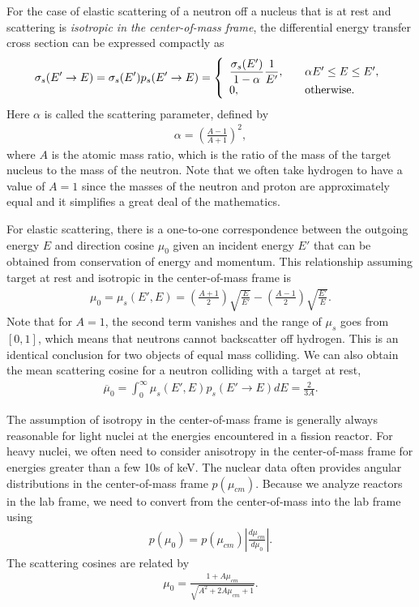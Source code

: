 For the case of elastic scattering of a neutron off a nucleus that is at rest and scattering is \emph{isotropic in the center-of-mass frame}, the differential energy transfer cross section can be expressed compactly as
\begin{align}
  \sigma_s(E' \rightarrow E) = \sigma_s(E') p_s(E' \rightarrow E) = \left\{ \begin{array}{l l}
  \dfrac{\sigma_s(E')}{1 - \alpha} \dfrac{1}{E'}, & \quad \alpha E' \le E \le E', \\
  0, & \quad \text{otherwise}. \\ \end{array} \right.
\end{align}
Here $\alpha$ is called the scattering parameter, defined by
\begin{align}
  \alpha = \left( \frac{A - 1}{A + 1} \right)^2, 
\end{align}
where $A$ is the atomic mass ratio, which is the ratio of the mass of the target nucleus to the mass of the neutron. Note that we often take hydrogen to have a value of $A = 1$ since the masses of the neutron and proton are approximately equal and it simplifies a great deal of the mathematics. 

For elastic scattering, there is a one-to-one correspondence between the outgoing energy $E$ and direction cosine $\mu_0$ given an incident energy $E'$ that can be obtained from conservation of energy and momentum. This relationship assuming target at rest and isotropic in the center-of-mass frame is
\begin{align}
  \mu_0 = \mu_s(E',E) = \left( \frac{A+1}{2} \right) \sqrt{\frac{E}{E'}} - \left( \frac{A-1}{2} \right) \sqrt{\frac{E'}{E}} .
\end{align}
Note that for $A = 1$, the second term vanishes and the range of $\mu_s$ goes from $[0,1]$, which means that neutrons cannot backscatter off hydrogen. This is an identical conclusion for two objects of equal mass colliding. We can also obtain the mean scattering cosine for a neutron colliding with a target at rest,
\begin{align}
  \overline{\mu}_0 = \int_0^\infty \mu_s(E',E) p_s(E' \rightarrow E) dE = \frac{2}{3A} .
\end{align}

The assumption of isotropy in the center-of-mass frame is generally always reasonable for light nuclei at the energies encountered in a fission reactor. For heavy nuclei, we often need to consider anisotropy in the center-of-mass frame for energies greater than a few 10s of keV. The nuclear data often provides angular distributions in the center-of-mass frame $p(\mu_{cm})$. Because we analyze reactors in the lab frame, we need to convert from the center-of-mass into the lab frame using
\begin{align}
  p(\mu_0) = p(\mu_{cm}) \left| \frac{d\mu_{cm}}{d\mu_0} \right| .
\end{align}
The scattering cosines are related by
\begin{align}
  \mu_0 = \frac{ 1 + A \mu_{cm} }{ \sqrt{ A^2 + 2 A \mu_{cm} + 1 } } .
\end{align}

